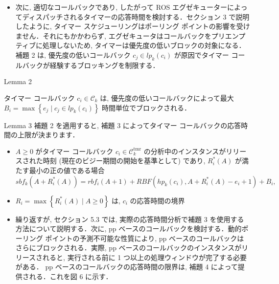 \begin{frame}{}
    \begin{itemize}
        \item 次に, 適切なコールバックであり, したがって ROS エグゼキューターによってディスパッチされるタイマーの応答時間を検討する．セクション 3 で説明したように, タイマー スケジューリングはポーリング ポイントの影響を受けません．それにもかかわらず, エグゼキュータはコールバックをプリエンプティブに処理しないため, タイマーは優先度の低いブロックの対象になる．補題 2 は, 優先度の低いコールバック $c_{j} \in l p_{k}\left(c_{i}\right)$ が原因でタイマー コールバックが経験するブロッキングを制限する．
    \end{itemize}
\end{frame}

\begin{frame}[label=lemma2]{Lemma 2}
    \begin{lemma}[]
        タイマー コールバック $c_{i} \in \mathcal{C}_{k}$ は, 優先度の低いコールバックによって最大 $B_{i}=\max \left\{e_{j} \mid c_{j} \in l p_{k}\left(c_{i}\right)\right\}$ 時間単位でブロックされる．
    \end{lemma}
\end{frame}

\begin{frame}[label=lemma3]{Lemma 3}
    補題 2 を適用すると, 補題 3 によってタイマー コールバックの応答時間の上限が決まります．
    \begin{lemma}[]
        \begin{itemize}
            \item $A \geq 0$ がタイマー コールバック $c_{i} \in \mathcal{C}_{k}^{\mathrm{tmr}}$ の分析中のインスタンスがリリースされた時刻 (現在のビジー期間の開始を基準として) であり, $R_{i}^{*}(A)$ が満たす最小の正の値である場合
                  \begin{equation*}
                      s b f_{k}\left(A+R_{i}^{*}(A)\right)=r b f_{i}(A+1)+R B F\left(h p_{k}\left(c_{i}\right), A+R_{i}^{*}(A)-e_{i}+1\right)+B_{i},
                  \end{equation*}
            \item $R_{i}=\max \left\{R_{i}^{*}(A) \mid A \geq 0\right\}$ は, $c_{i}$ の応答時間の境界
        \end{itemize}
    \end{lemma}
\end{frame}

\begin{frame}{}
    \begin{itemize}
        \item 繰り返すが, セクション 5.3 では, 実際の応答時間分析で補題 3 を使用する方法について説明する．次に, pp ベースのコールバックを検討する．動的ポーリング ポイントの予測不可能な性質により, pp ベースのコールバックはさらにブロックされる．実際, pp ベースのコールバックのインスタンスがリリースされると, 実行される前に 1 つ以上の処理ウィンドウが完了する必要がある． pp ベースのコールバックの応答時間の限界は, 補題 4 によって提供される．これを図 6 に示す．
    \end{itemize}
\end{frame}

